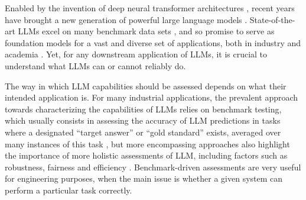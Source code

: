 \documentclass[fleqn]{article}
\begin{document}
Enabled by the invention of deep neural transformer architectures \citep{VaswaniShazeer2017:Attention-is-Al}, recent years have brought a new generation of powerful large language models  \citep{DevlinChang2019:BERT:-Pre-train,ChungHou2022:Scaling-Instruc,OpenAI2023:GPT-4-Technical,TouvronLavril2023:LLaMA:-Open-and}.
State-of-the-art LLMs excel on many benchmark data sets \citep[e.g.,][]{srivastava2023-BIGbench,PerezRinger2023:Discovering-Lan}, and so promise to serve as foundation models for a vast and diverse set of applications, both in industry and academia \citep{BommasaniHudson2021:On-the-opportun}.
Yet, for any downstream application of LLMs, it is crucial to understand what LLMs can or cannot reliably do.

The way in which LLM capabilities should be assessed depends on what their intended application is.
For many industrial applications, the prevalent approach towards characterizing the capabilities of LLMs relies on benchmark testing, which usually consists in assessing the accuracy of LLM predictions in tasks where a designated ``target answer'' or ``gold standard'' exists, averaged over many instances of this task \citep[e.g.,][]{srivastava2023-BIGbench}, but more encompassing approaches also highlight the importance of more holistic assessments of LLM, including factors such as robustness, fairness and efficiency \citep{LiangBommasani2023:Holistic-Evalua}.
Benchmark-driven assessments are very useful for engineering purposes, when the main issue is whether a given system can perform a particular task correctly.



\end{document}
